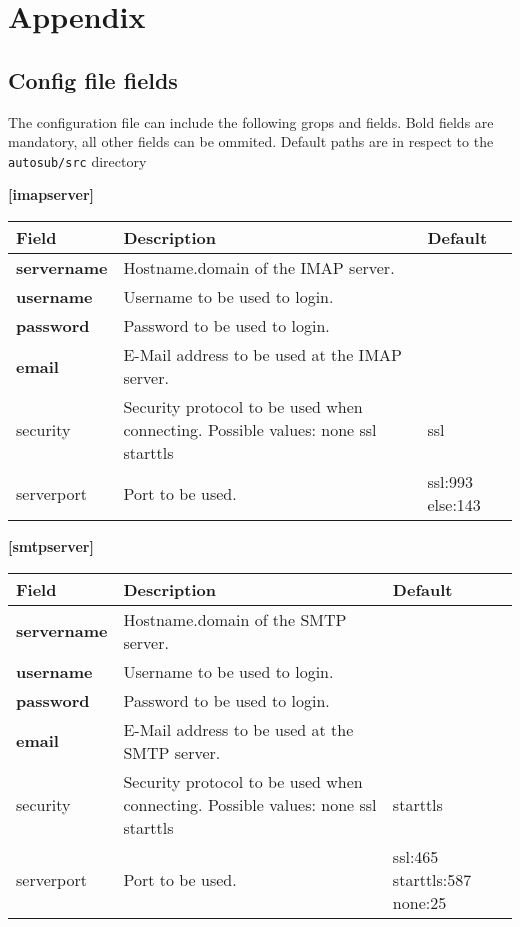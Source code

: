 \section{Appendix} \label{appendix}

\subsection{Config file fields} \label{app:config}
The configuration file can include the following grops and fields. Bold fields
are mandatory, all other fields can be ommited. Default paths are in respect to
the {\tt autosub/src} directory

{\bf [imapserver]}\\
\begin{tabular}{|p{2.5cm}|p{8cm}|p{2.5cm}|}
\hline
{\bf Field} & {\bf Description} & {\bf Default}\\
\hline
\hline
\textbf{servername} & Hostname.domain of the IMAP server. & ~\\
\hline
\textbf{username} & Username to be used to login. & ~ \\
\hline
\textbf{password} & Password to be used to login. & ~ \\
\hline
\textbf{email} & E-Mail address to be used at the IMAP server. & ~ \\
\hline
security & Security protocol to be used when connecting.
    Possible values: none ssl starttls & ssl \\
\hline
serverport & Port to be used. & ssl:993 else:143\\
\hline
\end{tabular}


{\bf [smtpserver]}\\
\begin{tabular}{|p{2.5cm}|p{8cm}|p{2.5cm}|}
\hline
{\bf Field} & {\bf Description} & {\bf Default}\\
\hline
\hline
\textbf{servername} & Hostname.domain of the SMTP server. & ~ \\
\hline
\textbf{username }& Username to be used to login. & ~ \\
\hline
\textbf{password} & Password to be used to login. & ~ \\
\hline
\textbf{email} & E-Mail address to be used at the SMTP server. & ~ \\
\hline
security & Security protocol to be used when connecting.
    Possible values: none ssl starttls & starttls\\
\hline
serverport & Port to be used. & ssl:465 starttls:587 none:25 \\
\hline
\end{tabular}

